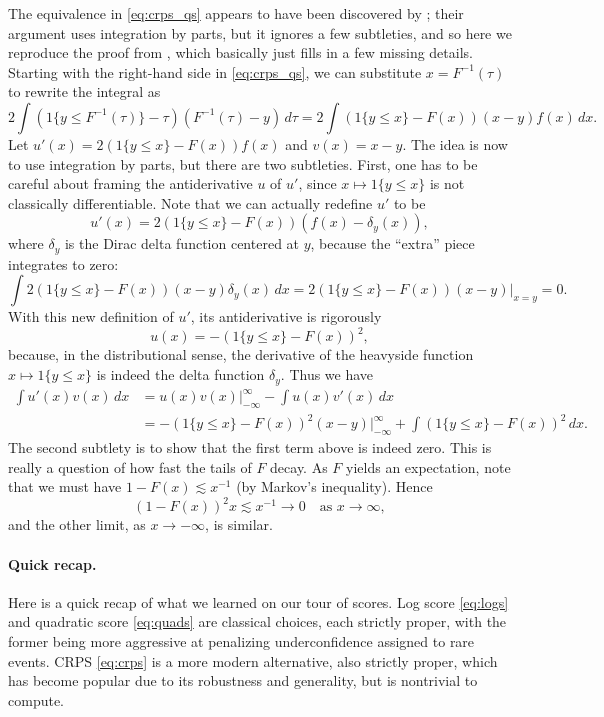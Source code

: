 \documentclass{article}
\begin{document}
The equivalence in \eqref{eq:crps_qs} appears to have been discovered by
\citet{laio2007verification}; their argument uses integration by parts, but it
ignores a few subtleties, and so here we reproduce the proof from
\citet{fakoor2021flexible}, which basically just fills in a few missing details.
Starting with the right-hand side in \eqref{eq:crps_qs}, we can substitute 
$x=F^{-1}(\tau)$ to rewrite the integral as   
\[
2 \int (1\{y \leq F^{-1}(\tau)\} - \tau) (F^{-1}(\tau)-y) \, d\tau =  
2 \int (1\{y \leq x\} - F(x)) (x-y) f(x) \, dx.
\]
Let $u'(x)=2(1\{y \leq x\} - F(x)) f(x)$ and $v(x)=x-y$. The idea is now to use 
integration by parts, but there are two subtleties. First, one has to be careful 
about framing the antiderivative $u$ of $u'$, since $x \mapsto 1\{y \leq x\}$ is
not classically differentiable. Note that we can actually redefine $u'$ to be   
\[
u'(x) = 2(1\{y \leq x\} - F(x)) (f(x) - \delta_y(x)),
\]
where $\delta_y$ is the Dirac delta function centered at $y$, because the
``extra'' piece integrates to zero:   
\[
\int 2(1\{y \leq x\} - F(x)) (x-y) \delta_y(x) \, dx =  
2(1\{y \leq x\} - F(x)) (x-y) \Big|_{x=y} = 0. 
\]
With this new definition of $u'$, its antiderivative is rigorously
\[
u(x) = -(1\{y \leq x\} - F(x))^2,
\] 
because, in the distributional sense, the derivative of the heavyside function
$x \mapsto 1\{y \leq x\}$ is indeed the delta function $\delta_y$. Thus we have   
\begin{align*}
\int u'(x) v(x) \, dx
&= u(x) v(x) \Big|_{-\infty}^\infty - \int u(x) v'(x) \,  dx \\ 
&= -(1\{y \leq x\} - F(x))^2 (x-y) \Big|_{-\infty}^\infty + 
\int (1\{y \leq x\} - F(x))^2 \, dx. 
\end{align*}
The second subtlety is to show that the first term above is indeed zero.  
This is really a question of how fast the tails of $F$ decay. As $F$ yields an
expectation, note that we must have $1-F(x) \lesssim x^{-1}$ (by Markov's
inequality). Hence    
\[
(1-F(x))^2 x \lesssim x^{-1} \to 0 \quad \text{as $x \to \infty$},
\]
and the other limit, as $x \to -\infty$, is similar.

\paragraph{Quick recap.}

Here is a quick recap of what we learned on our tour of scores. Log score
\eqref{eq:logs} and quadratic score \eqref{eq:quads} are classical choices, each
strictly proper, with the former being more aggressive at penalizing
underconfidence assigned to rare events. CRPS \eqref{eq:crps} is a more modern
alternative, also strictly proper, which has become popular due to its
robustness and generality, but is nontrivial to compute.        
\end{document}
